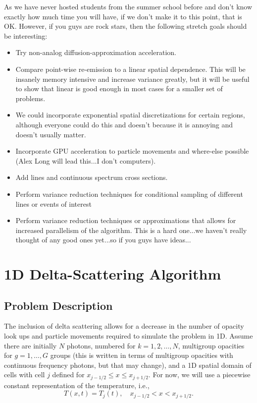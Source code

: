 \documentclass{article}
\newcommand{\xl}{{x_{j-1/2}}}
\newcommand{\xr}{{x_{j+1/2}}}
\begin{document}
As we have never hosted students from the summer school before and don't know
exactly how much time you will have, if we don't make
it to this point, that is OK.  However, if you guys are rock stars, then the
following stretch goals should be interesting:

\begin{itemize}

\item Try non-analog diffusion-approximation acceleration.
\item Compare point-wise re-emission to a linear spatial dependence.  This will
be insanely memory intensive and increase variance greatly, but it will be useful to show that linear is
good enough in most cases for a smaller set of problems.  
\item We could incorporate exponential spatial discretizations for certain
regions, although everyone could do this and doesn't because it is annoying and
doesn't usually matter.
\item Incorporate GPU acceleration to particle movements and where-else possible
(Alex Long will lead this...I don't computers).
\item Add lines and continuous spectrum cross sections.
\item Perform variance reduction techniques for conditional sampling of
different lines or events of interest
\item Perform variance reduction techniques or approximations that allows for increased
parallelism of the algorithm.  This is a hard one...we haven't really thought of
any good ones yet...so if you guys have ideas...

\end{itemize}

\section{1D Delta-Scattering Algorithm}

\subsection{Problem Description}

The inclusion of delta scattering allows for a decrease in the number of opacity
look ups and particle movements required to simulate the problem in 1D. Assume
there are initially $N$ photons, numbered for $k=1,2,\ldots,N$, multigroup opacities for
$g=1,\ldots,G$ groups (this is written in terms of multigroup opacities with
continuous frequency photons, but that may change), and a 1D spatial domain of cells with cell $j$ defined
for $\xl \leq x \leq \xr$.  For now, we will use a piecewise constant representation of the temperature, i.e.,
\begin{equation}
 T(x,t) = T_j(t), \quad \xl < x < \xr.
\end{equation}
\end{document}
